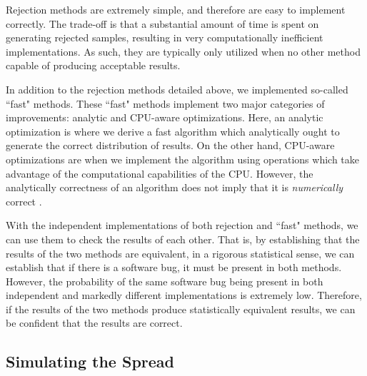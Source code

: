 \documentclass[a4paper]{article}
\begin{document}
Rejection methods are extremely simple, and therefore are easy to implement correctly.
The trade-off is that a substantial amount of time is spent on generating rejected samples, resulting in very
computationally inefficient implementations.
As such, they are typically only utilized when no other method capable of producing acceptable results.

In addition to the rejection methods detailed above, we implemented so-called ``fast" methods.
These ``fast" methods implement two major categories of improvements: analytic and CPU-aware optimizations.
Here, an analytic optimization is where we derive a fast algorithm which analytically ought to generate the correct
distribution of results.
On the other hand, CPU-aware optimizations are when we implement the algorithm using operations which take advantage of
the computational capabilities of the CPU.
However, the analytically correctness of an algorithm does not imply that it is \textit{numerically} correct
\cite{goldberg_what_1991, noauthor_ieee_1985}.

With the independent implementations of both rejection and ``fast" methods, we can use them to check the results of each
other.
That is, by establishing that the results of the two methods are equivalent, in a rigorous statistical sense, we can
establish that if there is a software bug, it must be present in both methods.
However, the probability of the same software bug being present in both independent and markedly different
implementations is extremely low.
Therefore, if the results of the two methods produce statistically equivalent results, we can be confident that the
results are correct.


\subsection{Simulating the Spread}
\end{document}
